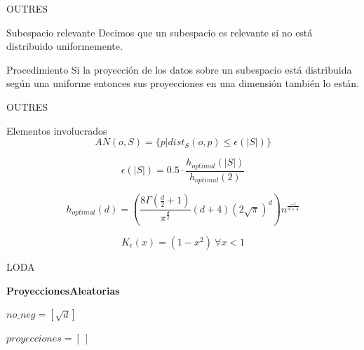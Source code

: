 \documentclass[10pt]{beamer}
\begin{document}
\begin{frame}[fragile]{OUTRES}
\vspace{10px}
\pause
{}

\begin{block}{Subespacio relevante}
	Decimos que un subespacio es relevante si no está distribuido uniformemente.
\end{block}

\pause

\begin{alertblock}{Procedimiento}
	Si la proyección de los datos sobre un subespacio está distribuida según una uniforme entonces sus proyecciones en una dimensión también lo están.
\end{alertblock}

\end{frame}

\begin{frame}[fragile]{OUTRES}
\vspace{10px}
\pause
{}

\begin{block}{Elementos involucrados}
	$$AN(o,S) = \{ p | dist_{S}(o,p)\leq \epsilon (|S|) \}$$
	
	\pause
	
	$$\epsilon (|S|) = 0.5 \cdot \frac{h_{optimal}(|S|)}{h_{optimal}(2)}$$
	
	\pause
	
	$$h_{optimal} (d) = (\frac{8\Gamma (\frac{d}{2} + 1)}{\pi^{\frac{d}{2}}}(d+4)(2\sqrt{\pi})^d) n^{\frac{-1}{d+4}}$$
	
	\pause
	
	$$K_{\epsilon}(x) = (1-x^2) \ \forall x<1$$
\end{block}

\end{frame}

\begin{frame}[fragile]{LODA}
\vspace{10px}
\pause
{}

\begin{algorithm}[H]{\textbf{ProyeccionesAleatorias}}
	
	
	$no\_neg = [\sqrt{d}]$
	
	$proyecciones = [ \ ]$
	
	
	
\end{algorithm}

\end{frame}
\end{document}

